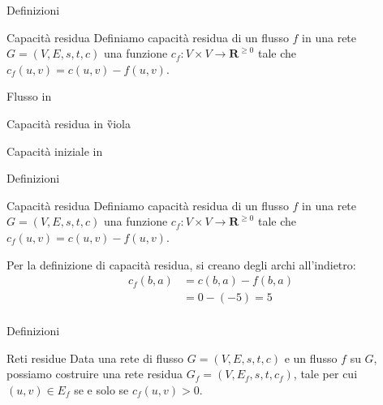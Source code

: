 \begin{frame}{Definizioni}

\vspace{-9pt}
\begin{block}{Capacità residua}
Definiamo \alert{capacità residua} di un flusso $f$ in una rete $G=(V,E,s,t,c)$ 
una funzione $c_f: V \times V \rightarrow \mathbf{R}^{\geq 0}$
tale che $c_f(u,v) = c(u,v) - f(u,v)$.
\end{block}

\smallskip
\begin{center}
\end{center}

\BI
\item Flusso in 
\item Capacità residua in \G{viola}
\item Capacità iniziale in 
\EI
\end{frame}

\begin{frame}{Definizioni}

\begin{block}{Capacità residua}
Definiamo \alert{capacità residua} di un flusso $f$ in una rete $G=(V,E,s,t,c)$ 
una funzione $c_f: V \times V \rightarrow \mathbf{R}^{\geq 0}$
tale che $c_f(u,v) = c(u,v) - f(u,v)$.
\end{block}

\smallskip
\begin{center}
\end{center}

Per la definizione di capacità residua, si creano degli archi all'indietro:
\begin{align*}
  c_f(b,a) &= c(b,a) - f(b,a) \\
           &= 0 - (-5)  = 5 \\
\end{align*}

\end{frame}

\begin{frame}{Definizioni}

\begin{block}{Reti residue}
Data una rete di flusso $G=(V,E,s,t,c)$ e un flusso $f$ su $G$, 
possiamo costruire una \alert{rete residua} $G_f=(V,E_f,s,t,c_f)$, tale
per cui $(u,v) \in E_f$ se e solo se $c_f(u,v) > 0$. 
\end{block}

\smallskip
\begin{center}
\end{center}

\end{frame}

